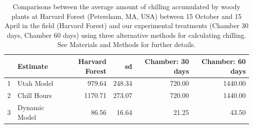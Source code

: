 \documentclass{article}\usepackage[]{graphicx}\usepackage[]{color}
\begin{document}
\begin{table}[ht]
\centering
\begin{tabular}{rlrrrr}
  \hline
 & Estimate & Harvard Forest & sd & Chamber: 30 days & Chamber: 60 days \\ 
  \hline
1 & Utah Model & 979.64 & 248.34 & 720.00 & 1440.00 \\ 
  2 & Chill Hours & 1170.71 & 273.07 & 720.00 & 1440.00 \\ 
  3 & Dynamic Model & 86.56 & 16.64 & 21.25 & 43.50 \\ 
   \hline
\end{tabular}
\caption{Comparisons between the average amount of chilling accumulated by woody plants at Harvard Forest (Petersham, MA, USA) between 15 October and 15 April in the field (Harvard Forest) and our experimental treatments (Chamber 30 days, Chamber 60 days)  using three alternative methods for calculating chilling. See Materials and Methods for further details.} 
\label{tab:chillcomps}
\end{table}
\end{document}
